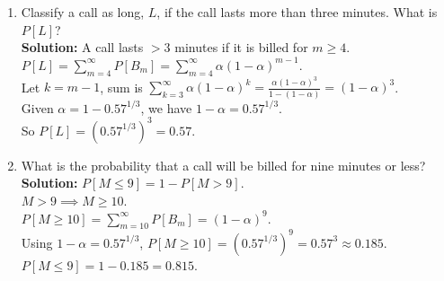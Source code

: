 \documentclass{article}
\begin{document}
\begin{enumerate}[label=(\alph*)]
    \item Classify a call as long, $L$, if the call lasts more than three minutes. What is $P[L]$? \\
    \textbf{Solution:} A call lasts $>3$ minutes if it is billed for $m \ge 4$. \\
    $P[L] = \sum_{m=4}^\infty P[B_m] = \sum_{m=4}^\infty \alpha(1-\alpha)^{m-1}$. \\
    Let $k=m-1$, sum is $\sum_{k=3}^\infty \alpha(1-\alpha)^k = \frac{\alpha(1-\alpha)^3}{1-(1-\alpha)} = (1-\alpha)^3$. \\
    Given $\alpha = 1 - 0.57^{1/3}$, we have $1-\alpha = 0.57^{1/3}$. \\
    So $P[L] = (0.57^{1/3})^3 = 0.57$.
    \item What is the probability that a call will be billed for nine minutes or less? \\
    \textbf{Solution:} $P[M \le 9] = 1 - P[M > 9]$. \\
    $M > 9 \implies M \ge 10$. \\
    $P[M \ge 10] = \sum_{m=10}^\infty P[B_m] = (1-\alpha)^9$. \\
    Using $1-\alpha = 0.57^{1/3}$, $P[M \ge 10] = (0.57^{1/3})^9 = 0.57^3 \approx 0.185$. \\
    $P[M \le 9] = 1 - 0.185 = 0.815$.
\end{enumerate}

\newpage
\end{document}

